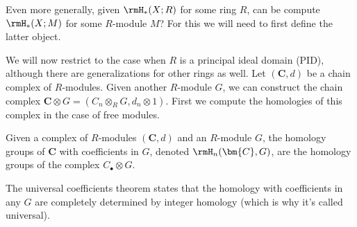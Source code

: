 Even more generally, given $\rmH_\ast(X;R)$ for some ring $R$, can be compute $\rmH_\ast(X;M)$ for some $R$-module $M$? For this we will need to first define the latter object.


We will now restrict to the case when $R$ is a principal ideal domain (PID), although there are generalizations for other rings as well. Let $(\bm{C},d)$ be a chain complex of $R$-modules.  Given another $R$-module $G$, we can construct the chain complex $\bm{C}\otimes G=(C_n\otimes_R G,d_n\otimes 1)$. First we compute the homologies of this complex in the case of free modules. 

\begin{defn}
    Given a complex of $R$-modules $(\bm{C},d)$ and an $R$-module $G$, the homology groups of $\bm{C}$ with coefficients in $G$, denoted $\rmH_n(\bm{C},G)$, are the homology groups of the complex $C_\bullet\otimes G$.
\end{defn}

The universal coefficients theorem states that the homology with coefficients in any $G$ are completely determined by integer homology (which is why it's called universal).

